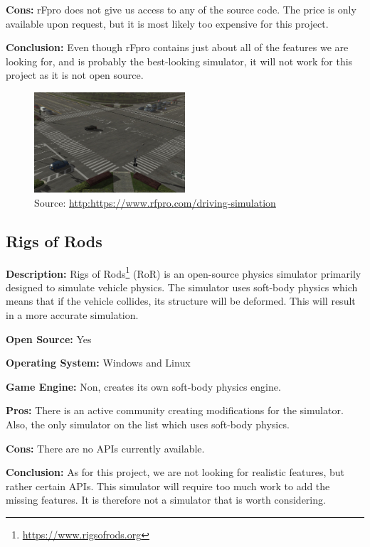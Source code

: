 \textbf{Cons:} rFpro does not give us access to any of the source code. The price is only available upon request, but it is most likely too expensive for this project. 

\textbf{Conclusion:} Even though rFpro contains just about all of the features we are looking for, and is probably the best-looking simulator, it will not work for this project as it is not open source. 

\begin{figure}[H]
    \centering
    \includegraphics[width=0.5\textwidth]{Simulators/rFpro.jpg}
    \caption{Source: \url{http:https://www.rfpro.com/driving-simulation}}
\end{figure}

\subsection{Rigs of Rods}
\textbf{Description:} Rigs of Rods\footnote{\url{https://www.rigsofrods.org}} (RoR) is an open-source physics simulator primarily designed to simulate vehicle physics. The simulator uses soft-body physics which means that if the vehicle collides, its structure will be deformed. This will result in a more accurate simulation.

\textbf{Open Source:} Yes

\textbf{Operating System:} Windows and Linux

\textbf{Game Engine:} Non, creates its own soft-body physics engine.

\textbf{Pros:} There is an active community creating modifications for the simulator. Also, the only simulator on the list which uses soft-body physics. 

\textbf{Cons:} There are no APIs currently available. 

\textbf{Conclusion:} As for this project, we are not looking for realistic features, but rather certain APIs. This simulator will require too much work to add the missing features. It is therefore not a simulator that is worth considering. 

